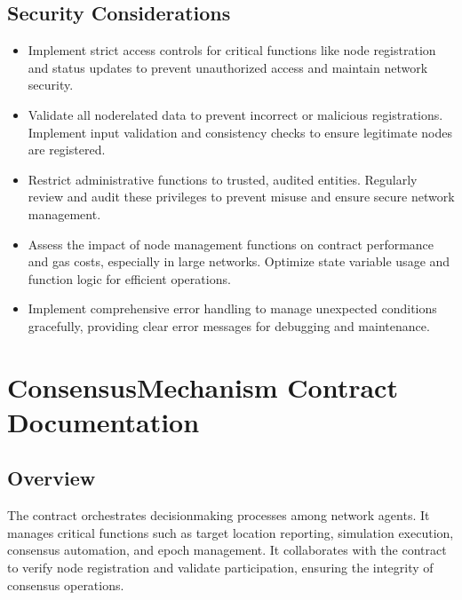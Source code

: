 \documentclass[a4paper,10pt,english]{sphinxmanual}
\begin{document}
\section{Security Considerations}
\label{\detokenize{docs_node_manager_contract:security-considerations}}\begin{itemize}
\item {} 
\sphinxAtStartPar
{} Implement strict access controls for critical functions like node registration and status updates to prevent unauthorized access and maintain network security.

\item {} 
\sphinxAtStartPar
{} Validate all node\sphinxhyphen{}related data to prevent incorrect or malicious registrations. Implement input validation and consistency checks to ensure legitimate nodes are registered.

\item {} 
\sphinxAtStartPar
{} Restrict administrative functions to trusted, audited entities. Regularly review and audit these privileges to prevent misuse and ensure secure network management.

\item {} 
\sphinxAtStartPar
{} Assess the impact of node management functions on contract performance and gas costs, especially in large networks. Optimize state variable usage and function logic for efficient operations.

\item {} 
\sphinxAtStartPar
{} Implement comprehensive error handling to manage unexpected conditions gracefully, providing clear error messages for debugging and maintenance.

\end{itemize}

\sphinxstepscope


\chapter{ConsensusMechanism Contract Documentation}
\label{\detokenize{docs_consensus_mechanism_contract:consensusmechanism-contract-documentation}}\label{\detokenize{docs_consensus_mechanism_contract::doc}}

\section{Overview}
\label{\detokenize{docs_consensus_mechanism_contract:overview}}
\sphinxAtStartPar
The  contract orchestrates decision\sphinxhyphen{}making processes among network agents. It manages critical functions such as target location reporting, simulation execution, consensus automation, and epoch management. It collaborates with the  contract to verify node registration and validate participation, ensuring the integrity of consensus operations.
\end{document}
